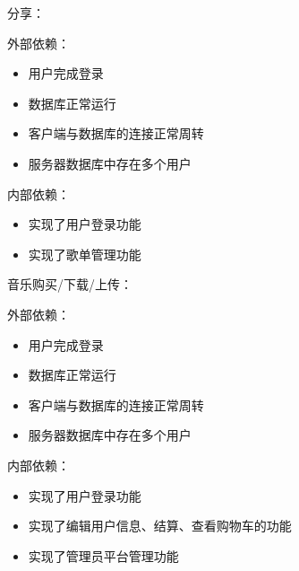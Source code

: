    分享：
  
   
    
    外部依赖：
    
    \begin{itemize}
    
    
    
        \item 用户完成登录
    
        \item 数据库正常运行
    
        \item 客户端与数据库的连接正常周转
    
        \item 服务器数据库中存在多个用户
    
    \end{itemize}
    
        
    
    内部依赖：
    
        \begin{itemize}
    
        \item 实现了用户登录功能
    
        \item 实现了歌单管理功能
    
    \end{itemize}
  
   音乐购买/下载/上传：
  
   
  
   
  
    外部依赖：
    
    \begin{itemize}
    
    
    
        \item 用户完成登录
    
        \item 数据库正常运行
    
        \item 客户端与数据库的连接正常周转
    
        \item 服务器数据库中存在多个用户
    
    \end{itemize}
    
        
    
    内部依赖：    
    
        \begin{itemize}
    
        \item 实现了用户登录功能
    
        \item 实现了编辑用户信息、结算、查看购物车的功能
    
        \item 实现了管理员平台管理功能 
    
    \end{itemize}


